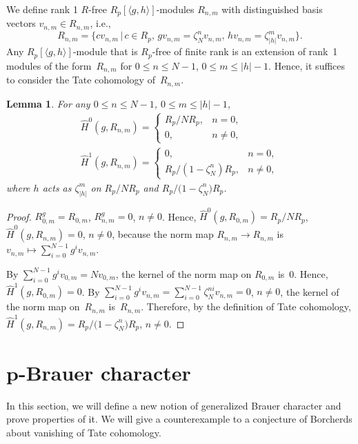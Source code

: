 \documentclass[10pt,a4paper]{amsart}
\numberwithin{equation}{section}
\newtheorem{Lemma}[Theorem]{Lemma}
\begin{document}
We define rank 1 $R$-free $R_p[\langle g,h \rangle]$-modules $R_{n,m}$ with distinguished basis vectors $v_{n,m}\in R_{n,m}$, i.e.,
\[
R_{n,m}=\big\{cv_{n,m}\,|\,c\in R_p,\, gv_{n,m}=\zeta_N^nv_{n,m},\, hv_{n,m}=\zeta_{|h|}^mv_{n,m}\big\}.
\]
 Any $R_p[\langle g,h \rangle]$-module that is $R_p$-free of finite rank is an extension of rank~1 modules of the form~$R_{n,m}$ for $0\leq n\leq N-1$, $0\leq m\leq |h|-1$.
Hence, it suffices to consider the Tate cohomology of~$R_{n,m}$.

\begin{Lemma}\label{Tcoho}
For any $0\leq n \leq N-1$, $0\leq m \leq |h|-1$,
\begin{gather*}
\hat{H}^0(g,R_{n,m})= \begin{cases}
R_p/NR_p, & n=0, \\
0, & n\neq 0,
\end{cases}\\
\hat{H}^1(g,R_{n,m})= \begin{cases}
0, & n=0, \\
R_p/(1-\zeta_N^n)R_p, & n\neq 0,
\end{cases}
\end{gather*}
where $h$ acts as $\zeta_{|h|}^m$ on $R_p/NR_p$ and $R_p/\big(1-\zeta_N^n\big)R_p$.
\end{Lemma}

\begin{proof}
$R_{0,m}^g=R_{0,m}$, $R_{n,m}^g=0$, $n\neq 0$. Hence, $\hat{H}^0(g,R_{0,m})=R_p/NR_p$,
 $\hat{H}^0(g,R_{n,m})=0$, $n\neq 0$, because the norm map $R_{n,m} \rightarrow R_{n,m}$ is $v_{n,m} \mapsto \sum_{i=0}^{N-1}g^iv_{n,m}$.

By $\sum_{i=0}^{N-1}g^iv_{0,m}=Nv_{0,m}$, the kernel of the norm map on $R_{0,m}$ is~0. Hence, $\hat{H}^1(g,R_{0,m})=0$. By $\sum_{i=0}^{N-1}g^iv_{n,m}=\sum_{i=0}^{N-1}\zeta_N^{ni}v_{n,m}=0$, $n \neq 0$, the kernel of the norm map on~$R_{n,m}$ is~$R_{n,m}$. Therefore, by the definition of Tate cohomology, $\hat{H}^1(g,R_{n,m})=R_p/\big(1-\zeta_N^n\big)R_p$, $n\neq 0$.
\end{proof}

\section[p-Brauer character]{$\boldsymbol{p}$-Brauer character}\label{section5}

In this section, we will define a new notion of generalized Brauer character and prove properties of it. We will give a counterexample to a conjecture of Borcherds about vanishing of Tate cohomology.
\end{document}
